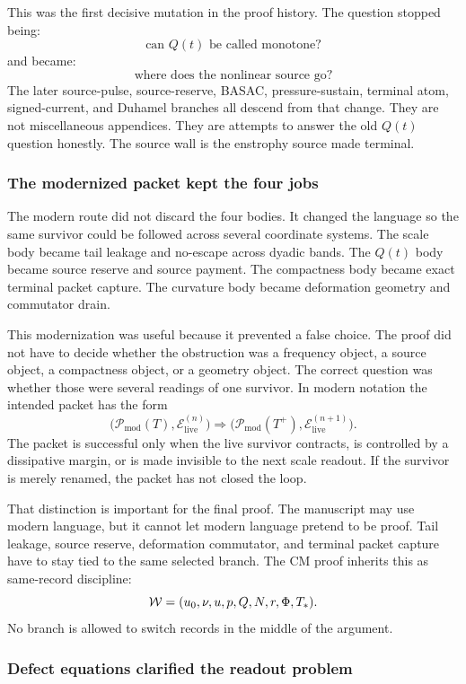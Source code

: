 This was the first decisive mutation in the proof history.
The question stopped being:
\[
  \text{can }Q(t)\text{ be called monotone?}
\]
and became:
\[
  \text{where does the nonlinear source go?}
\]
The later source-pulse, source-reserve, BASAC, pressure-sustain, terminal atom,
signed-current, and Duhamel branches all descend from that change.
They are not miscellaneous appendices.
They are attempts to answer the old \(Q(t)\) question honestly.
The source wall is the enstrophy source made terminal.

\subsubsection{The modernized packet kept the four jobs}

The modern route did not discard the four bodies.
It changed the language so the same survivor could be followed across several
coordinate systems.
The scale body became tail leakage and no-escape across dyadic bands.
The \(Q(t)\) body became source reserve and source payment.
The compactness body became exact terminal packet capture.
The curvature body became deformation geometry and commutator drain.

This modernization was useful because it prevented a false choice.
The proof did not have to decide whether the obstruction was a frequency
object, a source object, a compactness object, or a geometry object.
The correct question was whether those were several readings of one survivor.
In modern notation the intended packet has the form
\[
  \bigl(\mathcal P_{\mathrm{mod}}(T),
  \mathcal E_{\mathrm{live}}^{(n)}\bigr)
  \Longrightarrow
  \bigl(\mathcal P_{\mathrm{mod}}(T^+),
  \mathcal E_{\mathrm{live}}^{(n+1)}\bigr).
\]
The packet is successful only when the live survivor contracts, is controlled by a dissipative margin, or
is made invisible to the next scale readout.
If the survivor is merely renamed, the packet has not closed the loop.

That distinction is important for the final proof.
The manuscript may use modern language, but it cannot let modern language
pretend to be proof.
Tail leakage, source reserve, deformation commutator, and terminal packet
capture have to stay tied to the same selected branch.
The CM proof inherits this as same-record discipline:
\[
  \mathcal W=(u_0,\nu,u,p,Q,N,r,\Phi,T_*).
\]
No branch is allowed to switch records in the middle of the argument.

\subsubsection{Defect equations clarified the readout problem}

